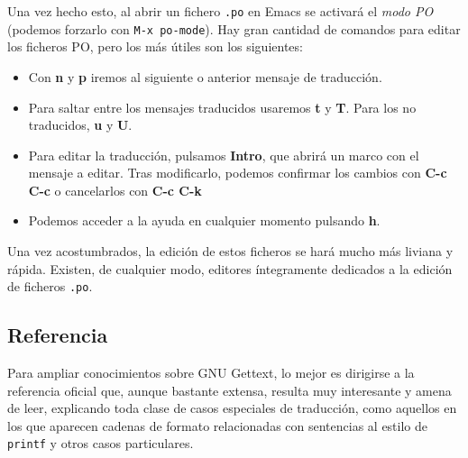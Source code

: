 Una vez hecho esto, al abrir un fichero \texttt{.po} en Emacs se activará el
\textit{modo PO} (podemos forzarlo con \texttt{M-x po-mode}). Hay gran cantidad
de comandos para editar los ficheros PO, pero los más útiles son los siguientes:

\begin{itemize}
\item Con \textbf{n} y \textbf{p} iremos al siguiente o anterior mensaje de
  traducción.
\item Para saltar entre los mensajes traducidos usaremos \textbf{t} y
  \textbf{T}. Para los no traducidos, \textbf{u} y \textbf{U}.
\item Para editar la traducción, pulsamos \textbf{Intro}, que abrirá un marco
  con el mensaje a editar. Tras modificarlo, podemos confirmar los cambios con
  \textbf{C-c C-c} o cancelarlos con \textbf{C-c C-k}
\item Podemos acceder a la ayuda en cualquier momento pulsando \textbf{h}.
\end{itemize}

Una vez acostumbrados, la edición de estos ficheros se hará mucho más liviana y
rápida. Existen, de cualquier modo, editores íntegramente dedicados a la edición
de ficheros \texttt{.po}.

\subsection{Referencia}
Para ampliar conocimientos sobre GNU Gettext, lo mejor es dirigirse a la
referencia oficial \cite{refrefgettext} que, aunque bastante extensa, resulta
muy interesante y amena de leer, explicando toda clase de casos especiales de
traducción, como aquellos en los que aparecen cadenas de formato relacionadas
con sentencias al estilo de \texttt{printf} y otros casos particulares.

